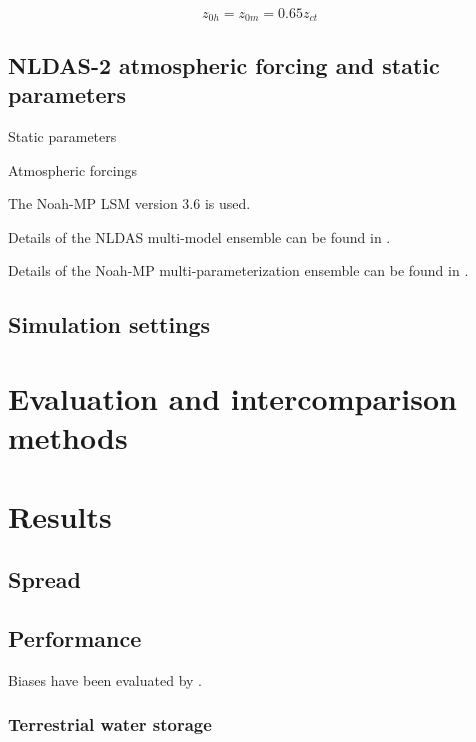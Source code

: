 \documentclass[essd]{copernicus}
\begin{document}
\begin{equation}
  z_{0h} = z_{0m} = 0.65 z_{ct}
\end{equation}


\subsection{NLDAS-2 atmospheric forcing and static parameters}\label{sec:data:nldas}

Static parameters

Atmospheric forcings

The Noah-MP LSM version 3.6 is used.

Details of the NLDAS multi-model ensemble can be found in \citet{xia2012JGRA,
xia2012JGRAa, fei2021WRR}.

Details of the Noah-MP multi-parameterization ensemble can be found in
\citet{zheng2019WRR, zheng2020JAMES, fei2021WRR}.


\subsection{Simulation settings}\label{sec:data:simulation}


\section{Evaluation and intercomparison methods}\label{sec:evaluation}


\section{Results} \label{sec:result}

\subsection{Spread}

\subsection{Performance}

Biases have been evaluated by \citet{zheng2020JAMES}.

\subsubsection{Terrestrial water storage}

\citep{landerer2012WRR}
\end{document}
